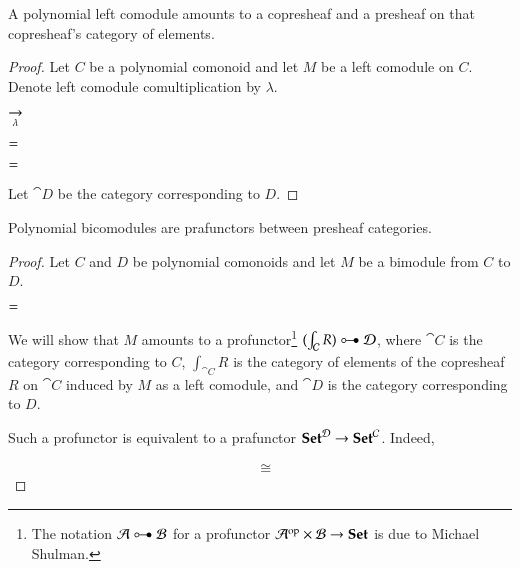 \documentclass{amsart}
\begin{document}
\begin{prop}
  A polynomial left comodule amounts to a copresheaf and a presheaf on that
  copresheaf's category of elements.
\end{prop}
\begin{proof}
  Let $C$ be a polynomial comonoid and let $M$ be a left comodule on
  $C$. Denote left comodule comultiplication by $\lambda$.

  \begin{center}
    
    \hspace{-.75em}
    $\underset{\lambda}{\to}$
    \hspace{.5em}
    
  \end{center}

  \begin{center}
    
    \quad
    $=$
    
  \end{center}
  
  \begin{center}
    
    \quad
    $=$
    \quad
    
  \end{center}

  Let $\cat{D}$ be the category corresponding to $D$. 
  
\end{proof}

\begin{prop}
  Polynomial bicomodules are prafunctors between presheaf categories.
\end{prop}
\begin{proof}
  Let $C$ and $D$ be polynomial comonoids and let $M$ be a bimodule
  from $C$ to $D$.  
  \begin{center}
    
    \quad
    $=$
    \quad
    
  \end{center}

  We will show that $M$ amounts to a profunctor\footnote{The notation
    $\cat{A} \prof \cat{B}$ for a profunctor
    $\mathcal{A}^{\mathrm{op}} \times \mathcal{B} \to {\normalfont\mathbf{Set}}$ is due to Michael Shulman.}
  $(\int_{\cat{C}} R) \prof \cat{D}$, where $\cat{C}$ is the category
  corresponding to $C$, $\int_{\cat{C}} R$ is the category of elements
  of the copresheaf $R$ on $\cat{C}$ induced by $M$ as a left
  comodule, and $\cat{D}$ is the category corresponding to $D$.

  Such a profunctor is equivalent to a prafunctor
  ${\normalfont\mathbf{Set}}^{\mathcal{D}} \to {\normalfont\mathbf{Set}}^{\mathcal{C}}$. Indeed,

  \begin{align*}
    &\cong
  \end{align*}
  
\end{proof}
\end{document}
